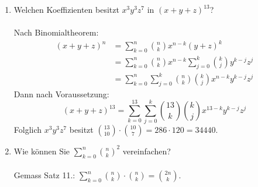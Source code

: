 \begin{enumerate}[label=(\alph*)]
        \item Welchen Koeffizienten besitzt $x^3y^3z^7$ in $(x+y+z)^{13}$?\\\\
        Nach Binomialtheorem:
        \begin{align*}
        (x+y+z)^{n} &= \sum_{k=0}^{n} \binom{n}{k}x^{n-k}(y+z)^k \\
        &= \sum_{k=0}^{n} \binom{n}{k}x^{n-k}\sum_{j=0}^{k}\binom{k}{j}y^{k-j}z^j \\
        &= \sum_{k=0}^{n}\sum_{j=0}^{k} \binom{n}{k}\binom{k}{j}x^{n-k}y^{k-j}z^j
        \end{align*}
        Dann nach Voraussetzung: 
        \[(x+y+z)^{13} = \sum_{k=0}^{13}\sum_{j=0}^{k} \binom{13}{k}\binom{k}{j}x^{13-k}y^{k-j}z^j\]
        Folglich $x^3y^3z^7$ besitzt $\binom{13}{10}\cdot\binom{10}{7} = 286 \cdot 120 = 34440$.

        \item Wie können Sie $\sum_{k=0}^n \binom{n}{k}^2$ vereinfachen?\\\\
        Gemass Satz 11.: $\sum_{k=0}^n \binom{n}{k}\cdot\binom{n}{k} = \binom{2n}{k}$.\\\\
    \end{enumerate}
    
